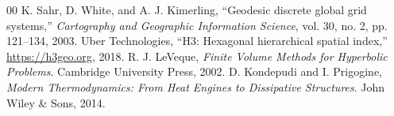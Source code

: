 \documentclass[10pt,journal,compsoc]{IEEEtran}
\begin{document}

\begin{thebibliography}{00}
 K. Sahr, D. White, and A. J. Kimerling, ``Geodesic discrete global grid systems,'' \emph{Cartography and Geographic Information Science}, vol. 30, no. 2, pp. 121--134, 2003.
 Uber Technologies, ``H3: Hexagonal hierarchical spatial index,'' \url{https://h3geo.org}, 2018.
 R. J. LeVeque, \emph{Finite Volume Methods for Hyperbolic Problems}. Cambridge University Press, 2002.
 D. Kondepudi and I. Prigogine, \emph{Modern Thermodynamics: From Heat Engines to Dissipative Structures}. John Wiley \& Sons, 2014.
\end{thebibliography}
\end{document}
